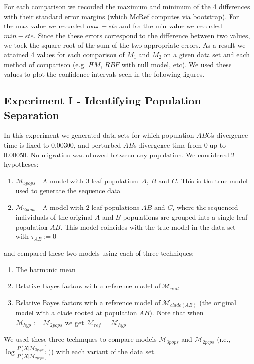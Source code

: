 \documentclass[11pt]{article}
\newcommand{\M}{\mathcal{M}}
\newcommand{\Mref}{\M_{ref}}
\newcommand{\Mhyp}{\M_{hyp}}
\newcommand{\1}{\mathbbm{1}}
\begin{document}
For each comparison we recorded the maximum and minimum of the 4 differences with their standard error margins (which McRef computes via bootstrap). 
%
For the max value we recorded $max+ste$ and for the min value we recorded $min-ste$. Since the these errors correspond to the difference between two values, we took the square root of the sum of the two appropriate errors. 
%
As a result we attained 4 values for each comparison of $M_1$ and $M_2$ on a given data set and each method of comparison (e.g. $HM$, $RBF$ with null model, etc). We used these values to plot the confidence intervals seen in the following figures.


\subsection{Experiment I - Identifying Population Separation}
In this experiment we generated data sets for which population $ABC$s divergence time is fixed to 0.00300, and perturbed $AB$s divergence time from 0 up to 0.00050. No migration was allowed between any population. We considered 2 hypotheses:
%
\begin{enumerate}
\item $\M_{3pops}$ - A model with 3 leaf populations $A$, $B$ and $C$. This is the true model used to generate the sequence data
\item $\M_{2pops}$ - A model with 2 leaf populations $AB$ and $C$, where the sequenced individuals of the original $A$ and $B$ populations are grouped into a single leaf population $AB$. This model coincides with the true model in the data set with $\tau_{AB}:=0$
\end{enumerate}
%
and compared these two models using each of three techniques:
%
\begin{enumerate}
\item The harmonic mean
\item Relative Bayes factors with a reference model of $\M_{null}$
\item Relative Bayes factors with a reference model of $\M_{clade(AB)}$ (the original model with a clade rooted at population $AB$). Note that when $\Mhyp := \M_{2pops}$ we get $\Mref=\Mhyp$
\end{enumerate}


We used these three techniques to compare models $\M_{3pops}$ and $\M_{2pops}$ (i.e., $\log{\frac{P(X|\M_{3pops})}{P(X|\M_{2pops})})}$) with each variant of the data set.
\end{document}
